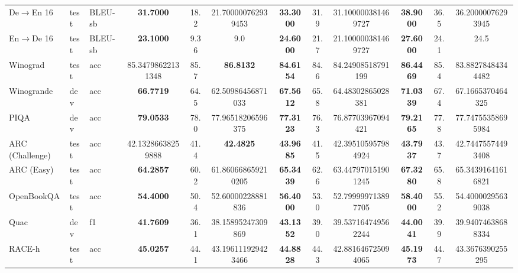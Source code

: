 \documentclass{article}
\theoremstyle{definition}
\begin{document}
\begin{table}
\begin{tabular}{lllSSSSSSSSS}
    De$\to$En 16 & test & BLEU-sb &
    \bfseries 31.7000 & 18.2 & 21.700000762939453 &
    \bfseries 33.3000 & 31.9 & 31.100000381469727 &
    \bfseries 38.9000 & 36.5 & 36.20000076293945
    \\

    En$\to$De 16 & test & BLEU-sb &
    \bfseries 23.1000 & 9.36 & 9.0 &
    \bfseries 24.6000 & 21.7 & 21.100000381469727 &
    \bfseries 27.6000 & 24.1 & 24.5
    \\

    Winograd & test & acc &
    85.34798622131348 & 85.7 & \bfseries 86.8132 &
    \bfseries 84.6154 & 84.6 & 84.24908518791199 &
    \bfseries 86.4469 & 85.4 & 83.88278484344482
    \\

    Winogrande & dev & acc &
    \bfseries 66.7719 & 64.5 & 62.50986456871033 &
    \bfseries 67.5612 & 65.8 & 64.48302865028381 &
    \bfseries 71.0339 & 67.4 & 67.1665370464325
    \\

    PIQA & dev & acc &
    \bfseries 79.0533 & 78.0 & 77.96518206596375 &
    \bfseries 77.3123 & 76.3 & 76.87703967094421 &
    \bfseries 79.2165 & 77.8 & 77.74755358695984
    \\

    ARC (Challenge) & test & acc &
    42.13286638259888 & 41.4 & \bfseries 42.4825 &
    \bfseries 43.9685 & 41.5 & 42.395105957984924 &
    \bfseries 43.7937 & 43.7 & 42.74475574493408
    \\

    ARC (Easy) & test & acc &
    \bfseries 64.2857 & 60.2 & 61.860668659210205 &
    \bfseries 65.3439 & 62.6 & 63.447970151901245 &
    \bfseries 67.3280 & 65.8 & 65.34391641616821
    \\

    OpenBookQA & test & acc &
    \bfseries 54.4000 & 50.4 & 52.60000228881836 &
    \bfseries 56.4000 & 53.0 & 52.799999713897705 &
    \bfseries 58.4000 & 55.2 & 54.40000295639038
    \\

    Quac & dev & f1 &
    \bfseries 41.7609 & 36.1 & 38.15895247309869 &
    \bfseries 43.1352 & 39.0 & 39.537164749562244 &
    \bfseries 44.0041 & 39.9 & 39.94074638688334
    \\

    RACE-h & test & acc &
    \bfseries 45.0257 & 44.1 & 43.196111929423466 &
    \bfseries 44.8828 & 44.3 & 42.881646725094065 &
    \bfseries 45.1973 & 44.7 & 43.3676390255295
    \\


\end{tabular}
\end{table}
\end{document}
